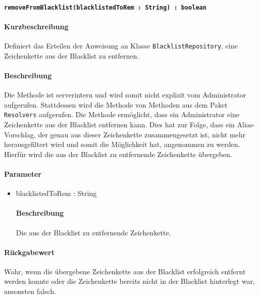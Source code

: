 \paragraph{\texttt{removeFromBlacklist(blacklistedToRem : String) : boolean}}%
\paragraph*{Kurzbeschreibung}
Definiert das Erteilen der Anweisung an Klasse \texttt{BlacklistRepository}, eine Zeichenkette aus der Blacklist zu entfernen.
\paragraph*{Beschreibung}
Die Methode ist serverintern und wird somit nicht explizit vom Administrator aufgerufen.
Stattdessen wird die Methode von Methoden aus dem Paket \texttt{Resolvers} aufgerufen.
Die Methode ermöglicht, dass ein Administrator eine Zeichenkette aus der Blacklist entfernen kann.
Dies hat zur Folge, dass ein Alias-Vorschlag, der genau aus dieser Zeichenkette zusammengesetzt ist, nicht mehr herausgefiltert wird und somit die Möglichkeit hat, angenommen zu werden.
Hierfür wird die aus der Blacklist zu entfernende Zeichenkette übergeben.
\paragraph*{Parameter}
\begin{itemize}
    \item blacklistedToRem : String
    		\paragraph*{Beschreibung}
    		Die aus der Blacklist zu entfernende Zeichenkette.
\end{itemize}
\paragraph*{Rückgabewert}
Wahr, wenn die übergebene Zeichenkette aus der Blacklist erfolgreich entfernt werden konnte oder die Zeichenkette bereits nicht in der Blacklist hinterlegt war, ansonsten falsch.
